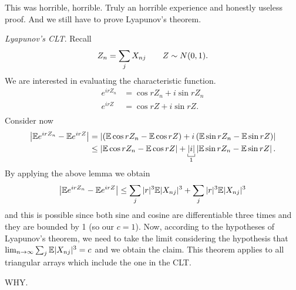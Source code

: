 \documentclass{report}
\begin{document}
This was horrible, horrible. Truly an horrible experience and honestly useless proof. And we still have to prove Lyapunov's theorem. 
\begin{fancyproof}
	\emph{Lyapunov's CLT}. Recall
	\begin{equation*}
		Z_{n}=\sum_{j}X_{nj}\qquad Z\sim N(0,1).
	\end{equation*}
	We are interested in evaluating the characteristic function.
	\begin{align*}
		e^{irZ_n}&=\cos rZ_n+i\sin rZ_n\\
		e^{irZ}&=\cos rZ+i\sin rZ.\\
	\end{align*}
	Consider now
	\begin{align*}
		\left|\ev e^{irZ_n}-\ev e^{irZ}\right|&=\left|\left(\ev\cos rZ_n-\ev\cos rZ\right)+i\left(\ev\sin rZ_n-\ev\sin rZ\right)\right|\\
		&\leq\left|\ev\cos rZ_n-\ev\cos rZ\right|+\underbracket[0.4pt]{|i|}_{1}\left|\ev\sin rZ_n-\ev\sin rZ\right|.
	\end{align*}
	By applying the above lemma  we obtain
	\begin{equation*}
			\left|\mathbb{E} e^{irZ_n}-\mathbb{E} e^{irZ}\right|\leq\sum_j|r|^{3}\mathbb{E}|X_{nj}|^{3}+\sum_{j}|r|^{3}\mathbb{E}|X_{nj}|^{3}
	\end{equation*}
	and this is possible since both sine and cosine are differentiable three times and they are bounded by 1 (so our $c=1$). Now, according to the hypotheses of Lyapunov's theorem, we need to take the limit considering the hypothesis that $\lim_{n\to\infty}\sum_j\mathbb{E}|X_{nj}|^{3}=c$ and we obtain the claim. This theorem applies to all triangular arrays which include the one in the CLT.
\end{fancyproof}
WHY.
\end{document}
